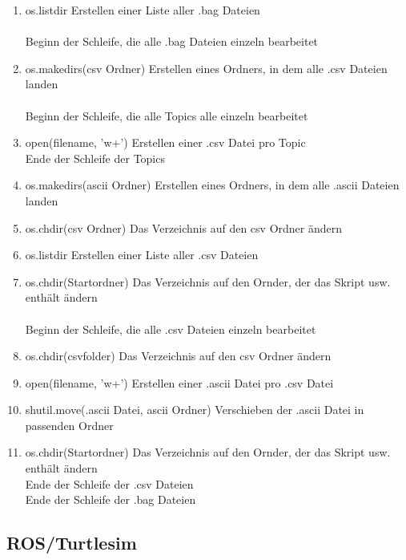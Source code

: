 \documentclass[11pt]{scrartcl}
\begin{document}
\begin{onehalfspace}
\begin{enumerate}
\item os.listdir	Erstellen einer Liste aller .bag Dateien\\\\
Beginn der Schleife, die alle .bag Dateien einzeln bearbeitet
\item os.makedirs(csv Ordner)	 Erstellen eines Ordners, in dem alle .csv Dateien landen\\\\
Beginn der Schleife, die alle Topics alle einzeln bearbeitet
\item open(filename, 'w+')	 Erstellen einer .csv Datei pro Topic\\
Ende der Schleife der Topics\\
\item os.makedirs(ascii Ordner)	  Erstellen eines Ordners, in dem alle .ascii Dateien landen\\
\item os.chdir(csv Ordner)	 Das Verzeichnis auf den csv Ordner ändern
\item os.listdir	Erstellen einer Liste aller .csv Dateien
\item os.chdir(Startordner)	 Das Verzeichnis auf den Ornder, der das Skript usw. enthält ändern\\\\
Beginn der Schleife, die alle .csv Dateien einzeln bearbeitet
\item os.chdir(csvfolder)	 Das Verzeichnis auf den csv Ordner ändern
\item  open(filename, 'w+')	 Erstellen einer .ascii Datei pro .csv Datei
\item shutil.move(.ascii Datei, ascii Ordner)	 Verschieben der .ascii Datei in passenden Ordner
\item os.chdir(Startordner)	 Das Verzeichnis auf den Ornder, der das Skript usw. enthält ändern\\
Ende der Schleife der .csv Dateien\\
Ende der Schleife der .bag Dateien

\end{enumerate}


\subsection{ROS/Turtlesim}


\end{onehalfspace}
\end{document}
